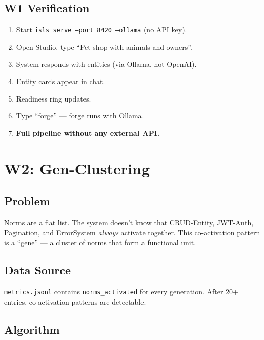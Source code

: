 \documentclass[11pt,a4paper]{article}
\begin{document}
\subsection{W1 Verification}

\begin{enumerate}[nosep]
\item Start \texttt{isls serve --port 8420 --ollama} (no API key).
\item Open Studio, type ``Pet shop with animals and owners''.
\item System responds with entities (via Ollama, not OpenAI).
\item Entity cards appear in chat.
\item Readiness ring updates.
\item Type ``forge'' --- forge runs with Ollama.
\item \textbf{Full pipeline without any external API.}
\end{enumerate}


\section{W2: Gen-Clustering}
\label{sec:w2}

\subsection{Problem}

Norms are a flat list. The system doesn't know that CRUD-Entity, 
JWT-Auth, Pagination, and ErrorSystem \emph{always} activate 
together. This co-activation pattern is a ``gene'' --- a cluster 
of norms that form a functional unit.

\subsection{Data Source}

\texttt{metrics.jsonl} contains \texttt{norms\_activated} for 
every generation. After 20+ entries, co-activation patterns 
are detectable.

\subsection{Algorithm}
\end{document}
